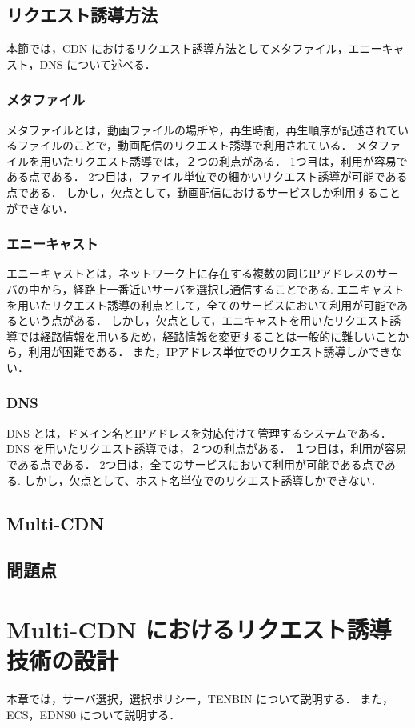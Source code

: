 \documentclass[a4j,12pt,onecolumn,oneside,titlepage,openany,final]{jreport}
\begin{document}
\section{リクエスト誘導方法}
本節では，CDN におけるリクエスト誘導方法としてメタファイル，エニーキャスト，DNS について述べる．
\subsection{メタファイル}
メタファイルとは，動画ファイルの場所や，再生時間，再生順序が記述されているファイルのことで，動画配信のリクエスト誘導で利用されている．
メタファイルを用いたリクエスト誘導では，２つの利点がある．
1つ目は，利用が容易である点である．
2つ目は，ファイル単位での細かいリクエスト誘導が可能である点である．
しかし，欠点として，動画配信におけるサービスしか利用することができない．
\subsection{エニーキャスト}
エニーキャストとは，ネットワーク上に存在する複数の同じIPアドレスのサーバの中から，経路上一番近いサーバを選択し通信することである.
エニキャストを用いたリクエスト誘導の利点として，全てのサービスにおいて利用が可能であるという点がある．
しかし，欠点として，エニキャストを用いたリクエスト誘導では経路情報を用いるため，経路情報を変更することは一般的に難しいことから，利用が困難である．
また，IPアドレス単位でのリクエスト誘導しかできない．
\subsection{DNS}
DNS とは，ドメイン名とIPアドレスを対応付けて管理するシステムである．
DNS を用いたリクエスト誘導では，２つの利点がある．
１つ目は，利用が容易である点である．
2つ目は，全てのサービスにおいて利用が可能である点である.
しかし，欠点として、ホスト名単位でのリクエスト誘導しかできない．
\section{Multi-CDN}
\section{問題点}

 
\chapter{Multi-CDN におけるリクエスト誘導技術の設計}\label{chap:Design}
本章では，サーバ選択，選択ポリシー，TENBIN について説明する．
また，ECS，EDNS0 について説明する．
\end{document}
